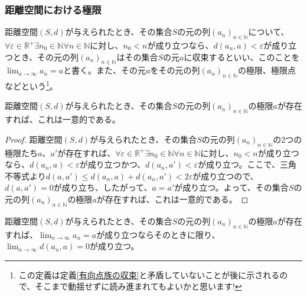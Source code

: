 \documentclass[dvipdfmx]{jsarticle}
\begin{document}
\subsubsection{距離空間における極限}%
\begin{dfn}
距離空間$(S,d)$が与えられたとき、その集合$S$の元の列$\left( a_{n} \right)_{n \in \mathbb{N}}$について、$\forall\varepsilon \in \mathbb{R}^{+}\exists n_{0} \in \mathbb{N}\forall n \in \mathbb{N}$に対し、$n_{0} < n$が成り立つなら、$d\left( a_{n},a \right) < \varepsilon$が成り立つとき、その元の列$\left( a_{n} \right)_{n \in \mathbb{N}}$はその集合$S$の元$a$に収束するといい、このことを$\lim_{n \rightarrow \infty}a_{n} = a$と書く。また、その元$a$をその元の列$\left( a_{n} \right)_{n \in \mathbb{N}}$の極限、極限点などという\footnote{この定義は定義\ref{有向点族の収束}と矛盾していないことが後に示されるので、そこまで動揺せずに読み進まれてもよいかと思います! }。
\end{dfn}
\begin{thm}\label{8.2.1.11}
距離空間$(S,d)$が与えられたとき、その集合$S$の元の列$\left( a_{n} \right)_{n \in \mathbb{N}}$の極限$a$が存在すれば、これは一意的である。
\end{thm}
\begin{proof}
距離空間$(S,d)$が与えられたとき、その集合$S$の元の列$\left( a_{n} \right)_{n \in \mathbb{N}}$の2つの極限たち$a$、$a'$が存在すれば、$\forall\varepsilon \in \mathbb{R}^{+}\exists n_{0} \in \mathbb{N}\forall n \in \mathbb{N}$に対し、$n_{0} < n$が成り立つなら、$d\left( a_{n},a \right) < \varepsilon$が成り立つかつ、$d\left( a_{n},a' \right) < \varepsilon$が成り立つ。ここで、三角不等式より$d\left( a,a' \right) \leq d\left( a_{n},a \right) + d\left( a_{n},a' \right) < 2\varepsilon$が成り立つので、$d\left( a,a' \right) = 0$が成り立ち、したがって、$a = a'$が成り立つ。よって、その集合$S$の元の列$\left( a_{n} \right)_{n \in \mathbb{N}}$の極限$a$が存在すれば、これは一意的である。
\end{proof}
\begin{thm}\label{8.2.1.12}
距離空間$(S,d)$が与えられたとき、その集合$S$の元の列$\left( a_{n} \right)_{n \in \mathbb{N}}$の極限$a$が存在すれば、$\lim_{n \rightarrow \infty}a_{n} = a$が成り立つならそのときに限り、$\lim_{n \rightarrow \infty}{d\left( a_{n},a \right)} = 0$が成り立つ。
\end{thm}
\end{document}
